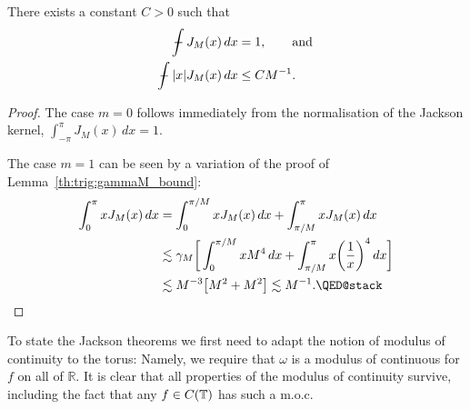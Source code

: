 \begin{lemma} \label{th:trig:jackson_moments}
  There exists a constant $C > 0$ such that 
  \begin{align*}
    \mint J_M(x) \,dx &= 1, \qquad \text{and}
    \\
    \mint |x| J_M(x) \, dx &\leq C M^{-1}.
  \end{align*}
\end{lemma}
\begin{proof}
  The case $m = 0$ follows immediately  from the normalisation of the
  Jackson kernel, $\int_{-\pi}^\pi J_M(x)\,dx = 1$.

  The case $m = 1$ can be seen by a variation of the proof of
  Lemma~\ref{th:trig:gammaM_bound}:
  \begin{align*}
    \int_0^\pi x J_M(x) \, dx
    &= 
    \int_0^{\pi/M} x J_M(x) \, dx
        + \int_{\pi/M}^{\pi}
             x J_M(x) \, dx \\
    &\lesssim
        \gamma_M \bg[ \int_0^{\pi/M} x M^4 \, dx
        + \int_{\pi/M}^{\pi}
             x \bg( \frac{1}{x} \bg)^4 \, dx \bg] \\
    &\lesssim
      M^{-3} \b[ M^{2} + M^{2} \b]
      \lesssim M^{-1}.
      \qedhere
  \end{align*}
\end{proof}

To state the Jackson theorems we first need to adapt the notion of modulus of continuity to the torus: Namely, we require that $\omega$ is a modulus of continuous for $f$ on all of $\mathbb{R}$. It is clear that all properties of the modulus of continuity survive, including the fact that any $f \in C(\mathbb{T})$ has such a m.o.c.

